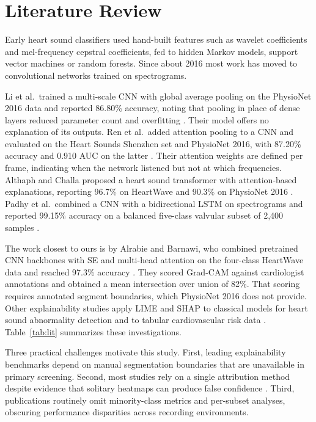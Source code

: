 \documentclass[conference]{IEEEtran}
\begin{document}
\section{Literature Review}
Early heart sound classifiers used hand-built features such as wavelet coefficients and mel-frequency cepstral coefficients, fed to hidden Markov models, support vector machines or random forests. Since about 2016 most work has moved to convolutional networks trained on spectrograms.

Li et al.\ trained a multi-scale CNN with global average pooling on the PhysioNet 2016 data and reported 86.80\% accuracy, noting that pooling in place of dense layers reduced parameter count and overfitting \cite{li}. Their model offers no explanation of its outputs. Ren et al.\ added attention pooling to a CNN and evaluated on the Heart Sounds Shenzhen set and PhysioNet 2016, with 87.20\% accuracy and 0.910 AUC on the latter \cite{ren}. Their attention weights are defined per frame, indicating when the network listened but not at which frequencies. Althaph and Challa proposed a heart sound transformer with attention-based explanations, reporting 96.7\% on HeartWave and 90.3\% on PhysioNet 2016 \cite{althaph}. Padhy et al.\ combined a CNN with a bidirectional LSTM on spectrograms and reported 99.15\% accuracy on a balanced five-class valvular subset of 2,400 samples \cite{padhy}.

The work closest to ours is by Alrabie and Barnawi, who combined pretrained CNN backbones with SE and multi-head attention on the four-class HeartWave data and reached 97.3\% accuracy \cite{alrabie}. They scored Grad-CAM against cardiologist annotations and obtained a mean intersection over union of 82\%. That scoring requires annotated segment boundaries, which PhysioNet 2016 does not provide. Other explainability studies apply LIME and SHAP to classical models for heart sound abnormality detection \cite{ramakrishna} and to tabular cardiovascular risk data \cite{guleria}. Table~\ref{tab:lit} summarizes these investigations.

Three practical challenges motivate this study. First, leading explainability benchmarks depend on manual segmentation boundaries that are unavailable in primary screening. Second, most studies rely on a single attribution method despite evidence that solitary heatmaps can produce false confidence \cite{chakrabarty}. Third, publications routinely omit minority-class metrics and per-subset analyses, obscuring performance disparities across recording environments.
\end{document}
